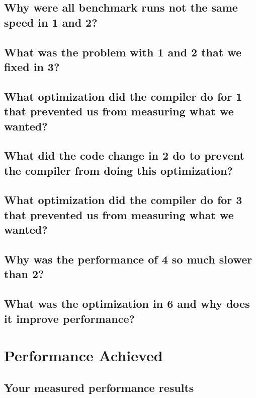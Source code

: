 \documentclass{article}
\begin{document}
\subsection{Why were all benchmark runs not the same speed in 1 and 2?}

\subsection{What was the problem with 1 and 2 that we fixed in 3?}

\subsection{What optimization did the compiler do for 1 that prevented us from measuring what we wanted?}

\subsection{What did the code change in 2 do to prevent the compiler from doing this optimization?}

\subsection{What optimization did the compiler do for 3 that prevented us from measuring what we wanted?}

\subsection{Why was the performance of 4 so much slower than 2?}

\subsection{What was the optimization in 6 and why does it improve performance?}


\section{Performance Achieved}

\subsection{Your measured performance results}
\end{document}
